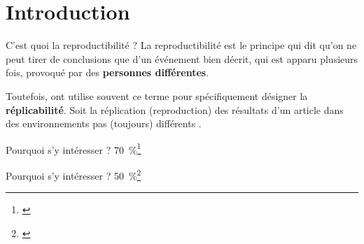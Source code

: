 \documentclass[aspectratio=169,10pt,xcolor=x11names,english,french]{beamer}
\begin{document}
	\section{Introduction}
	\begin{frame}{C'est quoi la reproductibilité ?}
		La reproductibilité est le principe qui dit qu'on ne peut tirer de conclusions que d'un événement bien décrit, qui est apparu plusieurs fois, provoqué par des \textbf{personnes différentes}.
		
		Toutefois, ont utilise souvent ce terme pour spécifiquement désigner la \textbf{réplicabilité}. Soit la réplication (reproduction) des résultats d'un article dans des environnements pas (toujours) différents \cite{replicationvsreproductiblity, pineau2020improving}.
		
	\end{frame}
	
	\begin{frame}{Pourquoi s'y intéresser ?}
		\centering
		\fontsize{35}{35}\selectfont\textcolor[cmyk]{0.67, 0.66, 0, 0.71}{70~\%}\footnote[1]{\cite{baker500ScientistsLift2016}}
		
	\end{frame}

	\begin{frame}{Pourquoi s'y intéresser ?}
	\centering
	\fontsize{35}{35}\selectfont\textcolor[cmyk]{0.67, 0.66, 0, 0.71}{50~\%}\footnote[1]{\cite{baker500ScientistsLift2016}}

		
	
	\end{frame}
\end{document}
